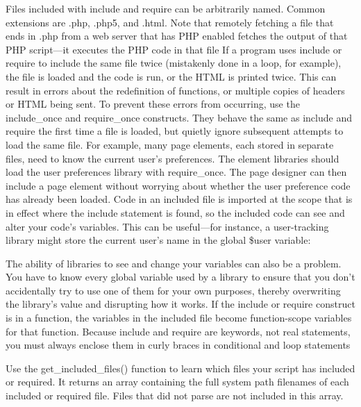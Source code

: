 \documentclass{report}
\begin{document}
\bigbreak \noindent 
Files included with include and require can be arbitrarily named. Common extensions are .php, .php5, and .html. Note that remotely fetching a file that ends in .php from a web server that has PHP enabled fetches the output of that PHP script—it executes the PHP code in that file
\bigbreak \noindent 
If a program uses include or require to include the same file twice (mistakenly done in
a loop, for example), the file is loaded and the code is run, or the HTML is printed
twice. This can result in errors about the redefinition of functions, or multiple copies
of headers or HTML being sent. To prevent these errors from occurring, use the
include\_once and require\_once constructs. They behave the same as include and
require the first time a file is loaded, but quietly ignore subsequent attempts to load
the same file. For example, many page elements, each stored in separate files, need to
know the current user’s preferences. The element libraries should load the user preferences library with require\_once. The page designer can then include a page element
without worrying about whether the user preference code has already been loaded.
\bigbreak \noindent 
Code in an included file is imported at the scope that is in effect where the include
statement is found, so the included code can see and alter your code’s variables. This
can be useful—for instance, a user-tracking library might store the current user’s name
in the global \$user variable:
\bigbreak \noindent 
{}
\bigbreak \noindent 
The ability of libraries to see and change your variables can also be a problem. You
have to know every global variable used by a library to ensure that you don’t accidentally try to use one of them for your own purposes, thereby overwriting the library’s
value and disrupting how it works.
\bigbreak \noindent 
If the include or require construct is in a function, the variables in the included file become function-scope variables for that function.
\bigbreak \noindent 
Because include and require are keywords, not real statements, you must always enclose them in curly braces in conditional and loop statements
\bigbreak \noindent 
{}
\bigbreak \noindent 
Use the get\_included\_files() function to learn which files your script has included or required. It returns an array containing the full system path filenames of each included or required file. Files that did not parse are not included in this array.
\end{document}
